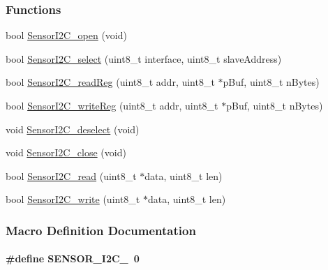 \subsubsection*{Functions}
\begin{DoxyCompactItemize}
\item 
bool \hyperlink{_sensor_i2_c_8h_ae48cb159e53f02d70de98dd8c65cda21}{Sensor\+I2\+C\+\_\+open} (void)
\item 
bool \hyperlink{_sensor_i2_c_8h_a879b500d39ef3aed6846eeb7e7a03cb1}{Sensor\+I2\+C\+\_\+select} (uint8\+\_\+t interface, uint8\+\_\+t slave\+Address)
\item 
bool \hyperlink{_sensor_i2_c_8h_acddf3bff1273609066a9fbcd167bae43}{Sensor\+I2\+C\+\_\+read\+Reg} (uint8\+\_\+t addr, uint8\+\_\+t $\ast$p\+Buf, uint8\+\_\+t n\+Bytes)
\item 
bool \hyperlink{_sensor_i2_c_8h_abcc5eb41a2dc8036ea3238a200dd462c}{Sensor\+I2\+C\+\_\+write\+Reg} (uint8\+\_\+t addr, uint8\+\_\+t $\ast$p\+Buf, uint8\+\_\+t n\+Bytes)
\item 
void \hyperlink{_sensor_i2_c_8h_a8e1291a81ac7875a040fda088682bb83}{Sensor\+I2\+C\+\_\+deselect} (void)
\item 
void \hyperlink{_sensor_i2_c_8h_a59f20ccd8b4f85091aec19244b00a736}{Sensor\+I2\+C\+\_\+close} (void)
\item 
bool \hyperlink{_sensor_i2_c_8h_ab70157b9853a993d1eeeb646673d2c65}{Sensor\+I2\+C\+\_\+read} (uint8\+\_\+t $\ast$data, uint8\+\_\+t len)
\item 
bool \hyperlink{_sensor_i2_c_8h_a330976806fff7d7d1b47a702cda4bd67}{Sensor\+I2\+C\+\_\+write} (uint8\+\_\+t $\ast$data, uint8\+\_\+t len)
\end{DoxyCompactItemize}


\subsubsection{Macro Definition Documentation}
\paragraph[{S\+E\+N\+S\+O\+R\+\_\+\+I2\+C\+\_\+0}]{\setlength{\rightskip}{0pt plus 5cm}\#define S\+E\+N\+S\+O\+R\+\_\+\+I2\+C\+\_~0}\label{_sensor_i2_c_8h_aa9cbb511d4299a3bc389624737c2b171}
